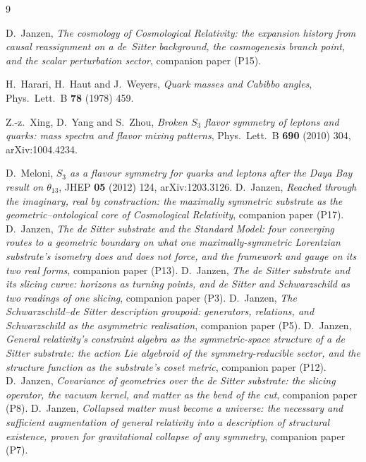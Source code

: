 \documentclass[11pt]{article}
\begin{document}
\begin{thebibliography}{9}

 D.~Janzen, \emph{The cosmology of Cosmological Relativity: the expansion history from causal reassignment on a de~Sitter background, the cosmogenesis branch point, and the scalar perturbation sector}, companion paper (P15).

 H.~Harari, H.~Haut and J.~Weyers,
\emph{Quark masses and Cabibbo angles}, Phys.\ Lett.\ B \textbf{78} (1978) 459.

 Z.-z.~Xing, D.~Yang and S.~Zhou,
\emph{Broken $S_3$ flavor symmetry of leptons and quarks: mass spectra and flavor mixing patterns},
Phys.\ Lett.\ B \textbf{690} (2010) 304, arXiv:1004.4234.

 D.~Meloni,
\emph{$S_3$ as a flavour symmetry for quarks and leptons after the Daya Bay result on $\theta_{13}$},
JHEP \textbf{05} (2012) 124, arXiv:1203.3126.
 D.~Janzen, \emph{Reached through the imaginary, real by construction: the maximally symmetric substrate as the geometric--ontological core of Cosmological Relativity}, companion paper (P17).
 D.~Janzen, \emph{The de Sitter substrate and the Standard Model: four converging routes to a geometric boundary on what one maximally-symmetric Lorentzian substrate's isometry does and does not force, and the framework and gauge on its two real forms}, companion paper (P13).
 D.~Janzen, \emph{The de Sitter substrate and its slicing curve: horizons as turning points, and de Sitter and Schwarzschild as two readings of one slicing}, companion paper (P3).
 D.~Janzen, \emph{The Schwarzschild--de Sitter description groupoid: generators, relations, and Schwarzschild as the asymmetric realisation}, companion paper (P5).
 D.~Janzen, \emph{General relativity's constraint algebra as the symmetric-space structure of a de Sitter substrate: the action Lie algebroid of the symmetry-reducible sector, and the structure function as the substrate's coset metric}, companion paper (P12).
 D.~Janzen, \emph{Covariance of geometries over the de Sitter substrate: the slicing operator, the vacuum kernel, and matter as the bend of the cut}, companion paper (P8).
 D.~Janzen, \emph{Collapsed matter must become a universe: the necessary and sufficient augmentation of general relativity into a description of structural existence, proven for gravitational collapse of any symmetry}, companion paper (P7).

\end{thebibliography}
\end{document}
